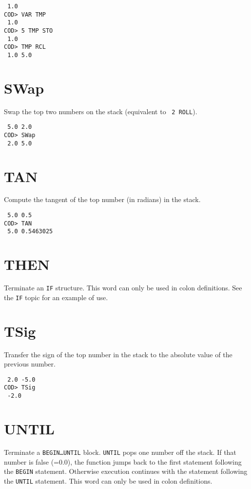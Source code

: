 \medskip
{}
\begin{verbatim}
 1.0
COD> VAR TMP
 1.0
COD> 5 TMP STO
 1.0
COD> TMP RCL
 1.0 5.0
\end{verbatim}

\section*{SWap}
Swap the top two numbers on the stack
(equivalent to \, {\tt 2~ROLL}).

\medskip
{}
\begin{verbatim}
 5.0 2.0
COD> SWap
 2.0 5.0
\end{verbatim}

\section*{TAN}
Compute the tangent of the top number (in radians) in the stack.

\medskip
{}
\begin{verbatim}
 5.0 0.5
COD> TAN
 5.0 0.5463025
\end{verbatim}

\section*{THEN}
Terminate an {\tt IF} structure.
This word can only be used in colon definitions.
See the {\tt IF} topic for an example of use.

\section*{TSig}
Transfer the sign of the top number in the stack
to the absolute value of the previous number.

\medskip
{}
\begin{verbatim}
 2.0 -5.0
COD> TSig
 -2.0
\end{verbatim}

\section*{UNTIL}
Terminate a {\tt BEGIN\ldots UNTIL} block.
{\tt UNTIL} pops one number off the stack.
If that number is false (=0.0),
the function jumps back to the first statement
following the {\tt BEGIN} statement.
Otherwise execution continues with the statement
following the {\tt UNTIL} statement.
This word can only be used in colon definitions.

